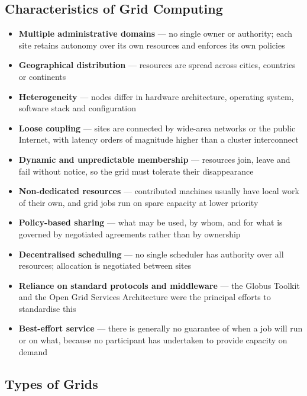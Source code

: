 \subsection{Characteristics of Grid Computing}

\begin{itemize}
  \item \textbf{Multiple administrative domains} --- no single owner or
        authority; each site retains autonomy over its own resources and
        enforces its own policies
  \item \textbf{Geographical distribution} --- resources are spread across
        cities, countries or continents
  \item \textbf{Heterogeneity} --- nodes differ in hardware architecture,
        operating system, software stack and configuration
  \item \textbf{Loose coupling} --- sites are connected by wide-area networks
        or the public Internet, with latency orders of magnitude higher than a
        cluster interconnect
  \item \textbf{Dynamic and unpredictable membership} --- resources join,
        leave and fail without notice, so the grid must tolerate their
        disappearance
  \item \textbf{Non-dedicated resources} --- contributed machines usually
        have local work of their own, and grid jobs run on spare capacity at
        lower priority
  \item \textbf{Policy-based sharing} --- what may be used, by whom, and for
        what is governed by negotiated agreements rather than by ownership
  \item \textbf{Decentralised scheduling} --- no single scheduler has
        authority over all resources; allocation is negotiated between sites
  \item \textbf{Reliance on standard protocols and middleware} --- the Globus
        Toolkit and the Open Grid Services Architecture were the principal
        efforts to standardise this
  \item \textbf{Best-effort service} --- there is generally no guarantee of
        when a job will run or on what, because no participant has undertaken
        to provide capacity on demand
\end{itemize}

\subsection{Types of Grids}


